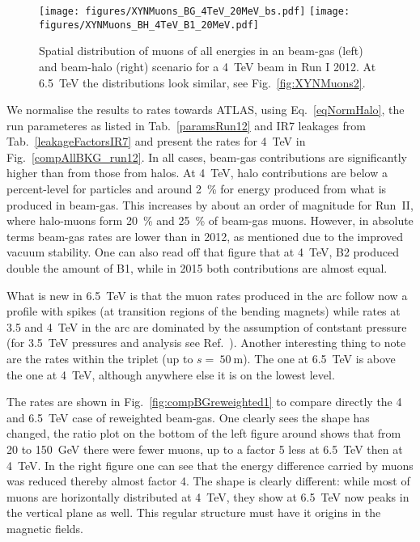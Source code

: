 \begin{figure} %
  \centering
  \texttt{[image: figures/XYNMuons\_BG\_4TeV\_20MeV\_bs.pdf]}
  \texttt{[image: figures/XYNMuons\_BH\_4TeV\_B1\_20MeV.pdf]}
  \caption{Spatial distribution of muons of all energies in an beam-gas (left) and beam-halo (right) scenario for a 4~TeV beam in Run I 2012. At 6.5~TeV the distributions look similar, see Fig.~\ref{fig:XYNMuons2}.
    \label{fig:XYNMuons}}
\end{figure}


We normalise the results to rates towards ATLAS, using Eq.~\ref{eqNormHalo}, the run parameteres as listed in Tab.~\ref{paramsRun12} and IR7 leakages from Tab.~\ref{leakageFactorsIR7} and present the rates for 4~TeV in Fig.~\ref{compAllBKG_run12}. In all cases, beam-gas contributions are significantly higher than from those from halos. At 4~TeV, halo contributions are below a percent-level for particles and around 2~\% for energy produced from what is produced in beam-gas. This increases by about an order of magnitude for Run~II, where halo-muons form 20~\% and 25~\% of beam-gas muons. However, in absolute terms beam-gas rates are lower than in 2012, as mentioned due to the improved vacuum stability. One can also read off that figure that at 4~TeV, B2 produced double the amount of B1, while in 2015 both contributions are almost equal.

What is new in 6.5~TeV is that the muon rates produced in the arc follow now a profile with spikes (at transition regions of the bending magnets) while rates at 3.5 and 4~TeV in the arc are dominated by the assumption of contstant pressure (for 3.5~TeV pressures and analysis see Ref.~\cite{nimPaperRod}). Another interesting thing to note are the rates within the triplet (up to $s =~50~$m). The one at 6.5~TeV is above the one at 4~TeV, although anywhere else it is on the lowest level.

The rates are shown in Fig.~\ref{fig:compBGreweighted1} to compare directly the 4 and 6.5~TeV case of reweighted beam-gas. One clearly sees the shape has changed, the ratio plot on the bottom of the left figure around shows that from 20 to 150~GeV there were fewer muons, up to a factor 5 less at 6.5~TeV then at 4~TeV. In the right figure one can see that the energy difference carried by muons was reduced thereby almost factor 4. The shape is clearly different: while most of muons are horizontally distributed at 4~TeV, they show at 6.5~TeV now peaks in the vertical plane as well. This regular structure must have it origins in the magnetic fields. 

